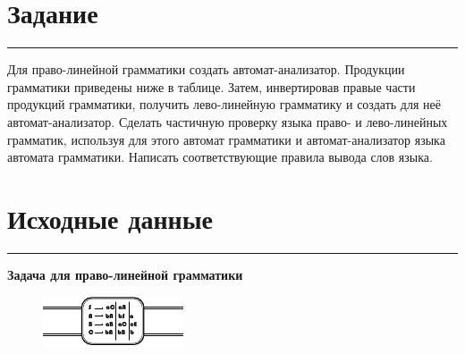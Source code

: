 \documentclass[a4paper, 14pt]{extarticle}
\begin{document}

\section*{Задание}\vspace{-20pt}\rule{\linewidth}{0.1mm}

Для право-линейной грамматики создать автомат-анализатор. 
Продукции грамматики приведены ниже в таблице. Затем, инвертировав 
правые части продукций грамматики, получить лево-линейную грамматику 
и создать для неё автомат-анализатор. Сделать частичную проверку языка 
право- и лево-линейных грамматик, используя для этого автомат грамматики и 
автомат-анализатор языка автомата грамматики. Написать соответствующие 
правила вывода слов языка.

\section*{Исходные данные}\vspace{-20pt}\rule{\linewidth}{0.1mm}

\begin{center}
  \normalsize
  \bfseries
  Задача для право-линейной грамматики
\end{center}

\vspace{-5pt}

\begin{figure}[h]
  \centering
  \includegraphics[width=\textwidth,height=\textheight,keepaspectratio]{graphics/data2}
\end{figure}
\end{document}
